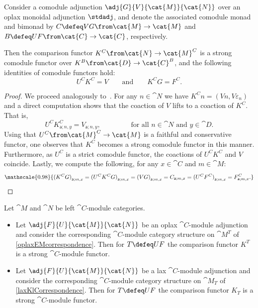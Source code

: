 \begin{proposition}\label{prop:comparison-functor-comodule-monad-comodule}
  Consider a comodule adjunction \(\adj{G}{V}{\cat{M}}{\cat{N}}\) over an oplax monoidal adjunction \(\stdadj\),
  and denote the associated comodule monad and bimonad by
  \(C \defeq VG \from \cat{M} \to \cat{M}\)
  and \(B \defeq UF \from \cat{C} \to \cat{C}\), respectively.

  Then the comparison functor \(K^{C} \from \cat{N} \to \cat{M}^C\) is
  a strong comodule functor over \(K^{B} \from \cat{D} \to \cat{C}^B\),
  and the following identities of comodule functors hold:
  \[
    U^C K^{C} = V \qquad\text{and}\qquad K^{C} G = F^C.
  \]
\end{proposition}
\begin{proof}
  We proceed analogously to~\cite[Theorem~2.6]{Bruguieres2007}.
  For any \(n \in \cat{N}\) we have \(K^{C}n= (Vn, V\varepsilon_{n})\) and a direct computation shows that the coaction of \(V\) lifts to a coaction of \(K^{C}\).
  That is,
  \[
    U^{C} K^C_{\mathsf{a}; n, y} = V_{\mathsf{a}; n, y}, \qquad \qquad \text{ for all } n \in \cat{N} \text{ and } y \in \cat{D}.
  \]
  Using that \(U^{C} \from \cat{M}^{C} \to \cat{M}\) is a faithful and conservative functor,
  one observes that \(K^{C}\) becomes a strong comodule functor in this manner.
  Furthermore, as \(U^{C}\) is a strict comodule functor,
  the coactions of \(U^{C}K^{C}\) and \(V\) coincide.
  Lastly, we compute the following, for any \(x \in \cat{C}\) and
  \(m \in \cat{M}\):
  \[\mathscale{0.98}{
      {(K^{C} G)}_{\mathsf{a};m, x}
      = {(U^C K^{C} G)}_{\mathsf{a};m,x}
      = {(VG)}_{\mathsf{a};m,x}
      = C_{\mathsf{a};m,x}
      = {(U^C F^C)}_{\mathsf{a};m,x}
      = F^C_{\mathsf{a};m,x}.
    }\qedhere\]
\end{proof}

\begin{proposition}\label{strongcomparisons}
  Let \(\cat{M}\) and \(\cat{N}\) be left \(\cat{C}\)\hyp{}module categories.
  \begin{itemize}
    \item Let \(\adj{F}{U}{\cat{M}}{\cat{N}}\) be an oplax \(\cat{C}\)\hyp{}module adjunction
    and consider the corresponding \(\cat{C}\)\hyp{}module category structure on \(\cat{M}^T\) of \cref{oplaxEMcorrespondence}.
    Then for \(T \defeq UF\) the comparison functor \(K^T\) is a strong \(\cat{C}\)\hyp{}module functor.
    \item Let \(\adj{F}{U}{\cat{M}}{\cat{N}}\) be
    a lax \(\cat{C}\)\hyp{}module adjunction
    and consider the corresponding \(\cat{C}\)\hyp{}module category structure on \(\cat{M}_T\) of \cref{laxKlCorrespondence}.
    Then for \(T \defeq UF\) the comparison functor \(K_T\) is a strong \(\cat{C}\)\hyp{}module functor.
  \end{itemize}
\end{proposition}

